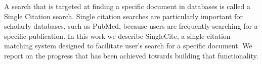 A search that is targeted at finding a specific document in databases is called a Single Citation search. Single citation searches are particularly important for scholarly databases, such as PubMed, because users are frequently searching for a specific publication. In this work we describe SingleCite, a single citation matching system designed to facilitate user's search for a specific document. We report on the progress that has been achieved towards building that functionality.

